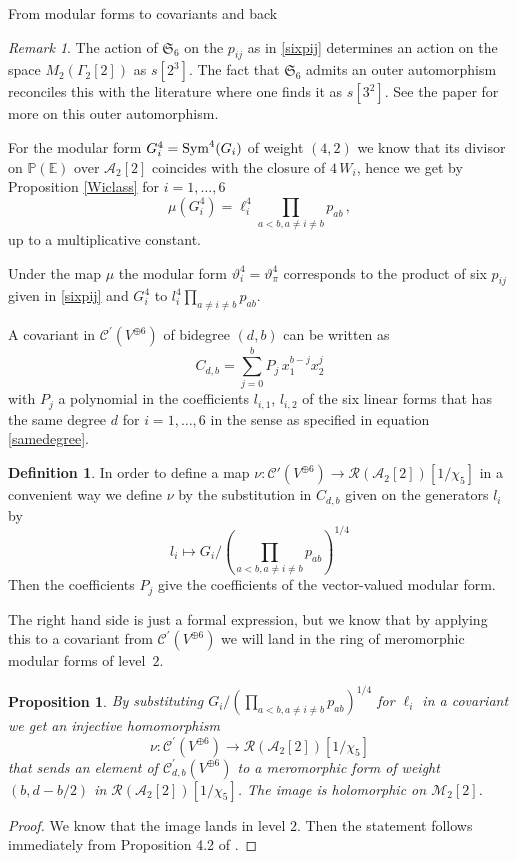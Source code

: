 \documentclass[12pt]{amsart}
\numberwithin{equation}{section}
\newcommand{\EE}{\mathbb E}
\newcommand{\PP}{\mathbb P}
\numberwithin{equation}{section}
\newtheorem{proposition}[theorem]{Proposition}
\theoremstyle{definition}
\newtheorem{definition}[theorem]{Definition}
\theoremstyle{remark}
\newtheorem{remark}[theorem]{Remark}
\begin{document}
\begin{section}{From modular forms to covariants and back}
\begin{remark}\label{outerauto}
The action of $\mathfrak{S}_6$ on the $p_{ij}$ as in \ref{sixpij} determines an action on the space
$M_2(\Gamma_2[2])$ as $s[2^3]$. The fact that $\mathfrak{S}_6$ admits an outer automorphism
reconciles this with the literature where one finds it as $s[3^2]$. See the paper \cite{HMSV}
for more on this outer automorphism. 
\end{remark}

For the modular form $G_i^4={\rm Sym}^4(G_i)$ of weight $(4,2)$ we know that its divisor on ${\PP}({\EE})$ 
over $\mathcal{A}_2[2]$ coincides with the closure of $4\, W_i$, hence we get by
Proposition \ref{Wiclass} for $i=1,\ldots,6$
$$
\mu(G_i^4)= \ell_i^4 \prod_{a<b, a\neq i \neq b} p_{ab}\, ,
$$
up to a multiplicative constant.


\bigskip
Under the map $\mu$ the modular form $\vartheta_i^4=\vartheta_{\pi}^4$ 
corresponds to the product of six $p_{ij}$ given in \ref{sixpij} and $G_i^4$ to $l_i^4 \prod_{a\neq i\neq b} p_{ab}$.

A covariant in $\mathcal{C}^{\prime}(V^{\oplus 6})$ of bidegree $(d,b)$ can be written as
\begin{equation}\label{Pi}
C_{d,b}= \sum_{j=0}^b P_j \, x_1^{b-j}x_2^j
\end{equation}
with $P_j$ a polynomial in the coefficients $l_{i,1}$, $l_{i,2}$ of the six linear forms that has the same degree $d$
for $i=1,\ldots,6$ in the sense as specified in equation \ref{samedegree}.

\begin{definition}
In order to define a map $\nu: \mathcal{C}'(V^{\oplus 6}) \to \mathcal{R}(\mathcal{A}_2[2])[1/\chi_5]$ 
in a convenient way we define $\nu$ by the substitution in $C_{d,b}$ given on the generators $l_i$ by
$$
l_i \mapsto G_i/(\prod_{a<b, a \neq i \neq b} p_{ab})^{1/4}
$$
Then the coefficients $P_j$ 
give the coefficients of the vector-valued modular form. 
\end{definition}
The right hand side is
just a formal expression, but we know that by applying this to a covariant 
from $\mathcal{C}^{\prime}(V^{\oplus 6})$ we will land in the ring of 
meromorphic modular forms of level~$2$.

\begin{proposition}
By substituting $G_i/(\prod_{a<b, a \neq i \neq b} p_{ab})^{1/4}$ for $\ell_i$ in a covariant we get an injective homomorphism
$$
\nu: \mathcal{C}^{\prime}(V^{\oplus 6}) \xrightarrow{} \mathcal{R}(\mathcal{A}_2[2])[1/\chi_5]
$$
that sends an element of $\mathcal{C}_{d,b}^{\prime}(V^{\oplus 6})$ to a meromorphic form of weight
$(b,d-b/2)$ in $\mathcal{R}(\mathcal{A}_2[2])[1/\chi_5]$.
The image is holomorphic on $\mathcal{M}_2[2]$.
\end{proposition}
\begin{proof} We know that the image lands in level $2$.
Then the statement follows immediately from Proposition 4.2 of \cite{CvdG2023}.
\end{proof}


\end{section}
\end{document}
